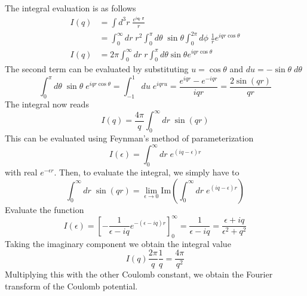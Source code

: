 \documentclass[../../../main.tex]{subfiles}
\begin{document}
The integral evaluation is as follows
\begin{align*}
  I(q) & =  \int d^3 r \; \frac{e^{i \mathbf{q }\cdot \mathbf{ r }}}{r }                                                 \\
       & = \int_{0}^{\infty}dr\;r^{2}\int_{0}^{\pi}d\theta\;\sin\theta\int_{0}^{2\pi}d\phi\;\frac{1}{r}e^{iqr\cos\theta} \\
  I(q) & =  2\pi\int_{0}^{\infty}dr\;r\int_{0}^{\pi}d\theta\sin\theta e^{iqr\cos\theta}
\end{align*}
The second term can be evaluated by substituting $u = \cos \theta$ and $du = -\sin \theta\;d\theta$
\begin{equation*}
  \int_{0}^{\pi} d\theta\;\sin\theta\;e^{iqr\cos\theta}
  = \int_{-1}^{1} du\; e^{iqru}
  = \frac{e^{iqr}-e^{-iqr}}{iqr}
  = \frac{2\sin(qr)}{qr}
\end{equation*}
The integral now reads
\begin{equation*}
  I(q)
  = \frac{4\pi}{q}\int_{0}^{\infty}dr\;\sin(qr)
\end{equation*}
This can be evaluated using Feynman's method of parameterization
\begin{equation*}
  I(\epsilon)
  = \int_{0 }^{\infty}dr\; e ^{(iq -\epsilon )r}
\end{equation*}
with real $e ^{-\epsilon r}$.
Then, to evaluate the integral, we simply have to
\begin{equation*}
  \int_{0}^{\infty}dr\;\sin(qr)
  = \lim_{\epsilon \rightarrow 0} \mathrm{Im} \left(\int_{0 }^{\infty}dr\; e ^{(iq -\epsilon )r}\right)
\end{equation*}
Evaluate the function
\begin{equation*}
  I(\epsilon)
  =\left[-\frac{1}{\epsilon-iq}e^{-(\epsilon-iq)r}\right]_{0}^{\infty}
  =\frac{1}{\epsilon-iq}
  = \frac{\epsilon+iq }{\epsilon^2 + q^2}
\end{equation*}
Taking the imaginary component we obtain the integral value
\begin{equation*}
  I(q) \frac{2\pi }{q }\frac{1 }{q } = \frac{4\pi }{q^2}
\end{equation*}
Multiplying this with the other Coulomb constant, we obtain the Fourier transform of the Coulomb potential.
\end{document}
